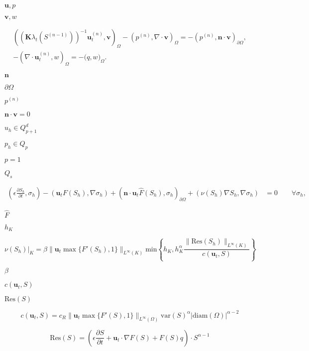 \documentclass{article}
\begin{document}
$\mathbf u, p$
\pagebreak

$\mathbf{v}, w$
\pagebreak

\begin{gather*} \left( \left( \mathbf{K} \lambda_t\left(S^{(n-1)}\right) \right)^{-1} \mathbf{u}^{(n)}_t, \mathbf{v}\right)_{\Omega} - \left(p^{(n)}, \nabla \cdot \mathbf{v}\right)_{\Omega} = -\left(p^{(n)}, \mathbf{n} \cdot \mathbf{v} \right)_{\partial \Omega}, \\ - \left( \nabla \cdot \mathbf{u}^{(n)}_t,w\right)_{\Omega} = - \big(q,w\big)_{\Omega}. \end{gather*}
\pagebreak

$\mathbf{n}$
\pagebreak

$\partial \Omega$
\pagebreak

$p^{(n)}$
\pagebreak

$\mathbf n \cdot \mathbf v=0$
\pagebreak

$u_h \in Q^d_{p+1}$
\pagebreak

$p_h \in Q_p$
\pagebreak

$p=1$
\pagebreak

$Q_s$
\pagebreak

\begin{align*} \left(\epsilon \frac{\partial S_h}{\partial t},\sigma_h\right) - \left(\mathbf{u}_t F\left( S_h \right), \nabla \sigma_h\right) + \left(\mathbf n \cdot \mathbf{u}_t \hat F\left( S_h \right), \sigma_h\right)_{\partial\Omega} + (\nu(S_h) \nabla S_h, \nabla \sigma_h) &=0 \qquad \forall \sigma_h, \end{align*}
\pagebreak

$\hat F$
\pagebreak

$h_{K}$
\pagebreak

\[ \nu(S_h)|_{K} = \beta \| \mathbf{u}_t \max\{F'(S_h),1\} \|_{L^{\infty}(K)} \textrm{min} \left\{ h_{K},h^{\alpha}_{K} \frac{\|\textrm{Res}(S_h)\|_{L^{\infty}(K)}}{c(\mathbf{u}_t,S)} \right\} \]
\pagebreak

$\beta$
\pagebreak

$c(\mathbf{u}_t,S)$
\pagebreak

$\textrm{Res}(S)$
\pagebreak

\[ c(\mathbf{u}_t,S) = c_R \|\mathbf{u}_t \max\{F'(S),1\}\|_{L^{\infty}(\Omega)} \textrm{var}(S)^\alpha | \textrm{diam} (\Omega) |^{\alpha - 2} \]
\pagebreak

\[ \textrm{Res}(S) = \left( \epsilon \frac{\partial S}{\partial t} + \mathbf{u}_t \cdot \nabla F(S) + F(S)q \right) \cdot S^{\alpha - 1} \]
\pagebreak
\end{document}
